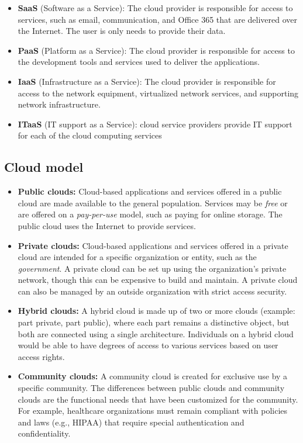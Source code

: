 \begin{itemize}
\item \textbf{SaaS} (Software as a Service): The cloud provider is responsible for access to services, such as email, communication, and Office 365 that are delivered over the Internet. The user is only needs to provide their data.
\item \textbf{PaaS} (Platform as a Service): The cloud provider is responsible for access to the development tools and services used to deliver the applications.
\item \textbf{IaaS} (Infrastructure as a Service): The cloud provider is responsible for access to the network equipment, virtualized network services, and supporting network infrastructure.
\item \textbf{ITaaS} (IT support as a Service): cloud service providers provide IT support for each of the cloud computing services
\end{itemize} 

\subsection{Cloud model}

\begin{itemize}
\item \textbf{Public clouds:} Cloud-based applications and services offered in a public cloud are made available to the general population. Services may be \emph{free} or are offered on a \emph{pay-per-use} model, such as paying for online storage. The public cloud uses the Internet to provide services.

\item \textbf{Private clouds:} Cloud-based applications and services offered in a private cloud are intended for a specific organization or entity, such as the \emph{government}. A private cloud can be set up using the organization's private network, though this can be expensive to build and maintain. A private cloud can also be managed by an outside organization with strict access security.

\item \textbf{Hybrid clouds:} A hybrid cloud is made up of two or more clouds (example: part private, part public), where each part remains a distinctive object, but both are connected using a single architecture. Individuals on a hybrid cloud would be able to have degrees of access to various services based on user access rights.

\item \textbf{Community clouds:} A community cloud is created for exclusive use by a specific community. The differences between public clouds and community clouds are the functional needs that have been customized for the community. For example, healthcare organizations must remain compliant with policies and laws (e.g., HIPAA) that require special authentication and confidentiality.
\end{itemize}


